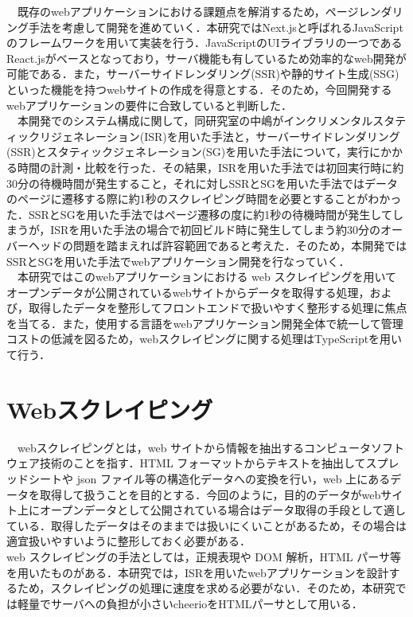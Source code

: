 　既存のwebアプリケーションにおける課題点を解消するため，ページレンダリング手法を考慮して開発を進めていく．本研究ではNext.jsと呼ばれるJavaScriptのフレームワークを用いて実装を行う．JavaScriptのUIライブラリの一つであるReact.jsがベースとなっており，サーバ機能も有しているため効率的なweb開発が可能である．また，サーバーサイドレンダリング(SSR)や静的サイト生成(SSG)といった機能を持つwebサイトの作成を得意とする．そのため，今回開発するwebアプリケーションの要件に合致していると判断した．\cite{next}\\
　本開発でのシステム構成に関して，同研究室の中嶋がインクリメンタルスタティックリジェネレーション(ISR)を用いた手法と，サーバーサイドレンダリング(SSR)とスタティックジェネレーション(SG)を用いた手法について，実行にかかる時間の計測・比較を行った．その結果，ISRを用いた手法では初回実行時に約30分の待機時間が発生すること，それに対しSSRとSGを用いた手法ではデータのページに遷移する際に約1秒のスクレイピング時間を必要とすることがわかった．SSRとSGを用いた手法ではページ遷移の度に約1秒の待機時間が発生してしまうが，ISRを用いた手法の場合で初回ビルド時に発生してしまう約30分のオーバーヘッドの問題を踏まえれば許容範囲であると考えた．そのため，本開発ではSSRとSGを用いた手法でwebアプリケーション開発を行なっていく．\cite{shu_sotsuken}\\
　本研究ではこのwebアプリケーションにおける web スクレイピングを用いてオープンデータが公開されているwebサイトからデータを取得する処理，および，取得したデータを整形してフロントエンドで扱いやすく整形する処理に焦点を当てる．また，使用する言語をwebアプリケーション開発全体で統一して管理コストの低減を図るため，webスクレイピングに関する処理はTypeScriptを用いて行う．\\


\section{Webスクレイピング}

　webスクレイピングとは，web サイトから情報を抽出するコンピュータソフトウェア技術のことを指す．HTML フォーマットからテキストを抽出してスプレッドシートや json ファイル等の構造化データへの変換を行い，web 上にあるデータを取得して扱うことを目的とする．今回のように，目的のデータがwebサイト上にオープンデータとして公開されている場合はデータ取得の手段として適している．取得したデータはそのままでは扱いにくいことがあるため，その場合は適宜扱いやすいように整形しておく必要がある．
 \\web スクレイピングの手法としては，正規表現や DOM 解析，HTML パーサ等を用いたものがある．本研究では，ISRを用いたwebアプリケーションを設計するため，スクレイピングの処理に速度を求める必要がない．そのため，本研究では軽量でサーバへの負担が小さいcheerioをHTMLパーサとして用いる．
 
